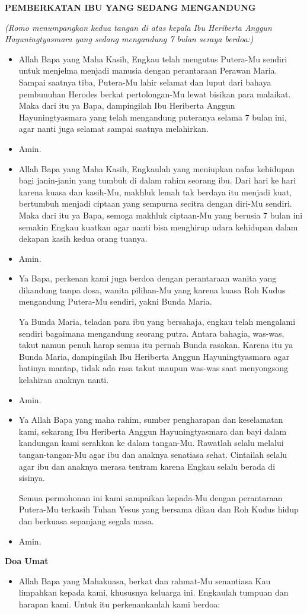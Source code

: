 \documentclass[12pt,twoside]{book}
\makeatletter
\newcommand{\judul}[1]{%
  {\parindent \z@ \centering \normalfont
    \interlinepenalty\@M \large \bfseries #1\par\nobreak \vskip 20\p@ }}
\newcommand{\subjudul}[1]{%
  {\parindent \z@ \normalfont
    \interlinepenalty\@M \bfseries #1\par\nobreak \vskip 20\p@ }}
\newcommand{\BU}[1]{\begin{itemize} \item[U:] #1 \end{itemize}}
\newcommand{\BI}[1]{\begin{itemize} \item[I:] #1 \end{itemize}}
\newcommand{\calonibu}{Heriberta Anggun Hayuningtyasmara\xspace}
\makeatother
\begin{document}
\judul{PEMBERKATAN IBU YANG SEDANG MENGANDUNG}
{\itshape (Romo menumpangkan kedua tangan di atas kepala Ibu \calonibu yang sedang mengandung 7 bulan seraya berdoa:)}
\BI{Allah Bapa yang Maha Kasih, Engkau telah mengutus Putera-Mu sendiri untuk menjelma menjadi manusia dengan perantaraan Perawan Maria. Sampai saatnya tiba, Putera-Mu lahir selamat dan luput dari bahaya pembunuhan Herodes berkat pertolongan-Mu lewat bisikan para malaikat. Maka dari itu ya Bapa, dampingilah Ibu \calonibu yang telah mengandung puteranya selama 7 bulan ini, agar nanti juga selamat sampai saatnya melahirkan.}
\BU{Amin.}
\BI{Allah Bapa yang Maha Kasih, Engkaulah yang meniupkan nafas kehidupan bagi janin-janin yang tumbuh di dalam rahim seorang ibu. Dari hari ke hari karena kuasa dan kasih-Mu, makhluk lemah tak berdaya itu menjadi kuat, bertumbuh menjadi ciptaan yang sempurna secitra dengan diri-Mu sendiri. Maka dari itu ya Bapa, semoga makhluk ciptaan-Mu yang berusia 7 bulan ini semakin Engkau kuatkan agar nanti bisa menghirup udara kehidupan dalam dekapan kasih kedua orang tuanya.}
\BU{Amin.}
\BI{Ya Bapa, perkenan kami juga berdoa dengan perantaraan wanita yang dikandung tanpa dosa, wanita pilihan-Mu yang karena kuasa Roh Kudus mengandung Putera-Mu sendiri, yakni Bunda Maria.

Ya Bunda Maria, teladan para ibu yang bersahaja, engkau telah mengalami sendiri bagaimana mengandung seorang putra. Antara bahagia, was-was, takut namun penuh harap semua itu pernah Bunda rasakan. Karena itu ya Bunda Maria, dampingilah Ibu \calonibu agar hatinya mantap, tidak ada rasa takut maupun was-was saat menyongsong kelahiran anaknya nanti.} 
\BU{Amin.}

\BI{Ya Allah Bapa yang maha rahim, sumber pengharapan dan keselamatan kami, sekarang Ibu \calonibu dan bayi dalam kandungan kami serahkan ke dalam tangan-Mu. Rawatlah selalu melalui tangan-tangan-Mu agar ibu dan anaknya senatiasa sehat. Cintailah selalu agar ibu dan anaknya merasa tentram karena Engkau selalu berada di sisinya. 

Semua permohonan ini kami sampaikan kepada-Mu dengan perantaraan Putera-Mu terkasih Tuhan Yesus yang bersama dikau dan Roh Kudus hidup dan berkuasa sepanjang segala masa.}
\BU{Amin.}



\subjudul{Doa Umat}
\BI{Allah Bapa yang Mahakuasa, berkat dan rahmat-Mu senantiasa Kau limpahkan kepada kami, khususnya keluarga ini. Engkaulah tumpuan dan harapan kami. Untuk itu perkenankanlah kami berdoa:}
\end{document}
